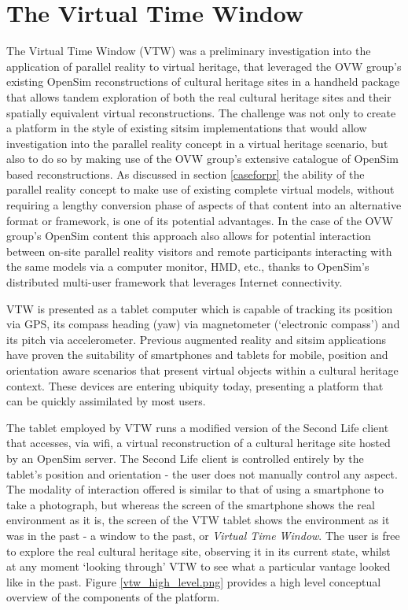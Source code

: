 
\section{The Virtual Time Window}
\label{the-virtual-time-window}
The Virtual Time Window (VTW) was a preliminary investigation into the application of parallel reality to virtual heritage, that leveraged the OVW group's existing OpenSim reconstructions of cultural heritage sites in a handheld package that allows tandem exploration of both the real cultural heritage sites and their spatially equivalent virtual reconstructions. The challenge was not only to create a platform in the style of existing sitsim implementations that would allow investigation into the parallel reality concept in a virtual heritage scenario, but also to do so by making use of the OVW group's extensive catalogue of OpenSim based reconstructions. As discussed in section \ref{caseforpr} the ability of the parallel reality concept to make use of existing complete virtual models, without requiring a lengthy conversion phase of aspects of that content into an alternative format or framework, is one of its potential advantages. In the case of the OVW group's OpenSim content this approach also allows for potential interaction between on-site parallel reality visitors and remote participants interacting with the same models via a computer monitor, HMD, etc., thanks to OpenSim's distributed multi-user framework that leverages Internet connectivity.

VTW is presented as a tablet computer which is capable of tracking its position via GPS, its compass heading (yaw) via magnetometer (`electronic compass') and its pitch via accelerometer. Previous augmented reality and sitsim applications have proven the suitability of smartphones and tablets for mobile, position and orientation aware scenarios that present virtual objects within a cultural heritage context. These devices are entering ubiquity today, presenting a platform that can be quickly assimilated by most users.

The tablet employed by VTW runs a modified version of the Second Life client that accesses, via wifi, a virtual reconstruction of a cultural heritage site hosted by an OpenSim server. The Second Life client is controlled entirely by the tablet's position and orientation - the user does not manually control any aspect. The modality of interaction offered is similar to that of using a smartphone to take a photograph, but whereas the screen of the smartphone shows the real environment as it is, the screen of the VTW tablet shows the environment as it was in the past - a window to the past, or \textit{Virtual Time Window}. The user is free to explore the real cultural heritage site, observing it in its current state, whilst at any moment `looking through' VTW to see what a particular vantage looked like in the past. Figure \ref{vtw_high_level.png} provides a high level conceptual overview of the components of the platform.

